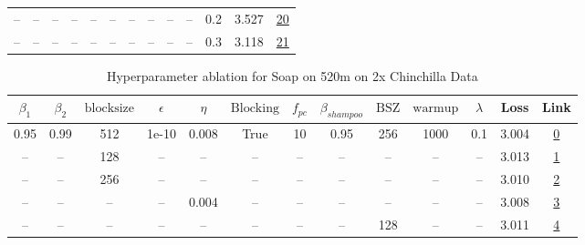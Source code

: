 \begin{table}[H]
\begin{tabular}{ccccccccccccc}
-- & -- & -- & -- & -- & -- & -- & -- & -- & -- & 0.2 & 3.527 & \href{https://wandb.ai/stanford-mercury/optimizer-scaling/runs/sweep-520m-10B-soapereaf2f7flr0.008-wd0.2-minlr0-warmup1000-b10.-4fca4a}{20} \\
-- & -- & -- & -- & -- & -- & -- & -- & -- & -- & 0.3 & 3.118 & \href{https://wandb.ai/stanford-mercury/optimizer-scaling/runs/sweep-520m-10B-soapereaaf64elr0.008-wd0.3-minlr0-warmup1000-b10.-0e5190}{21} \\
\bottomrule
\end{tabular}
\end{table}

\begin{table}[H]
\centering
\caption{Hyperparameter ablation for Soap on 520m on 2x Chinchilla Data}
\label{tab:ablation_soap_520m_2}
\begin{tabular}{ccccccccccccc}
\toprule
$\beta_1$ & $\beta_2$ & $\mathrm{block size}$ & $\epsilon$ & $\eta$ & $\mathrm{Blocking}$ & $f_{pc}$ & $\beta_{shampoo}$ & $\mathrm{BSZ}$ & $\mathrm{warmup}$ & $\lambda$ & Loss & Link \\
\midrule
0.95 & 0.99 & 512 & 1e-10 & 0.008 & True & 10 & 0.95 & 256 & 1000 & 0.1 & 3.004 & \href{https://wandb.ai/stanford-mercury/optimizer-scaling/runs/sweep-520m-21B-soapea9baa74lr0.008-wd0.1-minlr0-warmup1000-b10.9-7994bc}{0} \\
\midrule
-- & -- & 128 & -- & -- & -- & -- & -- & -- & -- & -- & 3.013 & \href{https://wandb.ai/stanford-mercury/optimizer-scaling/runs/sweep-520m-21B-soapeaf56540lr0.008-wd0.1-minlr0-warmup1000-b10.9-f05b1f}{1} \\
-- & -- & 256 & -- & -- & -- & -- & -- & -- & -- & -- & 3.010 & \href{https://wandb.ai/stanford-mercury/optimizer-scaling/runs/sweep-520m-21B-soapea3d9681lr0.008-wd0.1-minlr0-warmup1000-b10.9-efedef}{2} \\
-- & -- & -- & -- & 0.004 & -- & -- & -- & -- & -- & -- & 3.008 & \href{https://wandb.ai/stanford-mercury/optimizer-scaling/runs/sweep-520m-21B-soapea5a76ddlr0.004-wd0.1-minlr0-warmup1000-b10.9-f115eb}{3} \\
-- & -- & -- & -- & -- & -- & -- & -- & 128 & -- & -- & 3.011 & \href{https://wandb.ai/stanford-mercury/optimizer-scaling/runs/sweep-520m-21B-soapeaef50b6lr0.008-wd0.1-minlr0-warmup1000-b10.9-8aed93}{4} \\
\bottomrule
\end{tabular}
\end{table}

